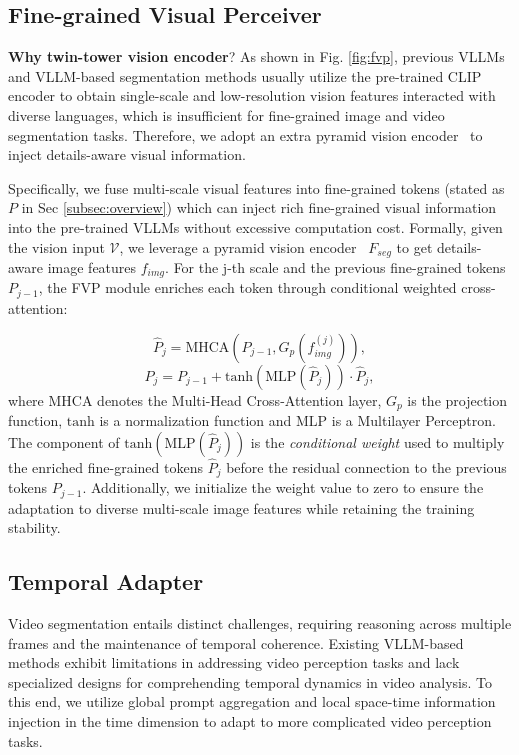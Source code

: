 \subsection{Fine-grained Visual Perceiver}
\label{subsec:fvp}
\textbf{Why twin-tower vision encoder}?
As shown in Fig. \ref{fig:fvp}, previous VLLMs and VLLM-based segmentation methods usually utilize the pre-trained CLIP encoder to obtain single-scale and low-resolution vision features interacted with diverse languages, which is insufficient for fine-grained image and video segmentation tasks.
Therefore, we adopt an extra pyramid vision encoder~\cite{cheng2022masked} to inject details-aware visual information. 

Specifically, we fuse multi-scale visual features into fine-grained tokens (stated as $P$ in Sec \ref{subsec:overview}) which can inject rich fine-grained visual information into the pre-trained VLLMs without excessive computation cost.
Formally, given the vision input $\mathcal{V}$, we leverage a pyramid vision encoder~\cite{cheng2022masked} $F_{seg}$ 
to get details-aware image features $f_{img}$. For the j-th scale and the previous fine-grained tokens $P_{j-1}$, the FVP module enriches each token through conditional weighted cross-attention: 

\begin{equation}
         \hat{P}_{j}=\textrm{MHCA}(P_{j-1}, G_{p}(f_{img}^{(j)})), 
    \label{eqn:gate1}
\end{equation}
\vspace{-5mm}
\begin{equation}
         P_{j}=P_{j-1} + \textrm{tanh}(\textrm{MLP}(\hat{P}_{j})) \cdot \hat{P}_{j},
    \label{eqn:gate2}
\end{equation}
where $\textrm{MHCA}$ denotes the Multi-Head Cross-Attention layer, $G_p$ is the projection function, $\textrm{tanh}$ is a normalization function and $\textrm{MLP}$ is a Multilayer Perceptron. The component of $\textrm{tanh}(\textrm{MLP}(\hat{P}_{j}))$ is the \emph{conditional weight} used to multiply the enriched fine-grained tokens $\hat{P}_{j}$ before the residual connection to the previous tokens $P_{j-1}$. Additionally, we initialize the weight value to zero to ensure the adaptation to diverse multi-scale image features while retaining the training stability.

 

\subsection{Temporal Adapter}
\label{subsec:videoadapt}
Video segmentation entails distinct challenges, requiring reasoning across multiple frames and the maintenance of temporal coherence. Existing VLLM-based methods exhibit limitations in addressing video perception tasks and lack specialized designs for comprehending temporal dynamics in video analysis.
To this end, we utilize global prompt aggregation and local space-time information injection in the time dimension to adapt to more complicated video perception tasks. 

